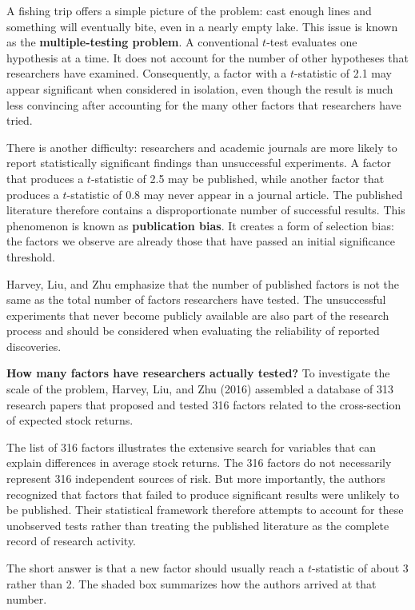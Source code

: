 A fishing trip offers a simple picture of the problem: cast enough lines and something will eventually bite, even in a nearly empty lake. This issue is known as the \textbf{multiple-testing problem}.
 A conventional $t$-test
evaluates one hypothesis at a time. It does not account for the
number of other hypotheses that researchers have examined.
Consequently, a factor with a $t$-statistic of 2.1 may appear
significant when considered in isolation, even though the result
is much less convincing after accounting for the many other
factors that researchers have tried.

There is another difficulty: researchers and academic journals
are more likely to report statistically significant findings than
unsuccessful experiments. A factor that produces a $t$-statistic
of 2.5 may be published, while another factor that produces a
$t$-statistic of 0.8 may never appear in a journal article. The
published literature therefore contains a disproportionate
number of successful results. This phenomenon is known as
\textbf{publication bias}. It
creates a form of selection bias: the factors we observe are
already those that have passed an initial significance threshold.

Harvey, Liu, and Zhu emphasize that the number of published
factors is not the same as the total number of factors researchers
have tested. The unsuccessful experiments that never become
publicly available are also part of the research process and
should be considered when evaluating the reliability of reported
discoveries.

\textbf{How many factors have researchers actually tested?}
To investigate the scale of the problem, Harvey, Liu, and Zhu
(2016) assembled a database of 313 research papers that proposed
and tested 316 factors related to the cross-section of expected
stock returns. 

The list of 316 factors illustrates the extensive search for
variables that can explain differences in average stock returns.
The 316 factors do
not necessarily represent 316 independent sources of risk.
But more importantly, the authors recognized that factors that failed to
produce significant results were unlikely to be published.
Their statistical framework therefore attempts to account for
these unobserved tests rather than treating the published
literature as the complete record of research activity.

The short answer is that a new factor should usually reach a $t$-statistic of about 3 rather than 2. The shaded box summarizes how the authors arrived at that number.

